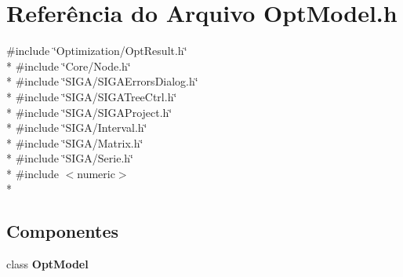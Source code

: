 \section{Referência do Arquivo Opt\+Model.\+h}
\label{_opt_model_8h}
{\ttfamily \#include \char`\"{}Optimization/\+Opt\+Result.\+h\char`\"{}}\\*
{\ttfamily \#include \char`\"{}Core/\+Node.\+h\char`\"{}}\\*
{\ttfamily \#include \char`\"{}S\+I\+G\+A/\+S\+I\+G\+A\+Errors\+Dialog.\+h\char`\"{}}\\*
{\ttfamily \#include \char`\"{}S\+I\+G\+A/\+S\+I\+G\+A\+Tree\+Ctrl.\+h\char`\"{}}\\*
{\ttfamily \#include \char`\"{}S\+I\+G\+A/\+S\+I\+G\+A\+Project.\+h\char`\"{}}\\*
{\ttfamily \#include \char`\"{}S\+I\+G\+A/\+Interval.\+h\char`\"{}}\\*
{\ttfamily \#include \char`\"{}S\+I\+G\+A/\+Matrix.\+h\char`\"{}}\\*
{\ttfamily \#include \char`\"{}S\+I\+G\+A/\+Serie.\+h\char`\"{}}\\*
{\ttfamily \#include $<$numeric$>$}\\*
\subsection*{Componentes}
\begin{DoxyCompactItemize}
\item 
class {\bf Opt\+Model}
\end{DoxyCompactItemize}
